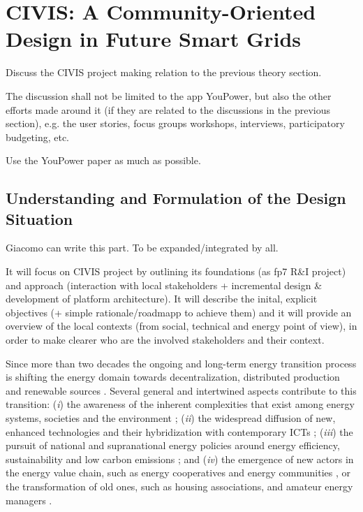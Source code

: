 \section{CIVIS: A Community-Oriented Design in Future Smart Grids}

\begin{svgraybox}
Discuss the CIVIS project making relation to the previous theory section. 

The discussion shall not be limited to the app YouPower, but also the other efforts made around it (if they are related to the discussions in the previous section), e.g. the user stories, focus groups workshops, interviews, participatory budgeting, etc. 

Use the YouPower paper as much as possible. 
\end{svgraybox}


\subsection{Understanding and Formulation of the Design Situation}
\begin{svgraybox}
[note by GP] Giacomo can write this part. To be expanded/integrated by all.

It will focus on CIVIS project by outlining its foundations (as fp7 R\&I project) and approach (interaction with local stakeholders + incremental design \& development of platform architecture). It will describe the inital, explicit objectives (+ simple rationale/roadmapp to achieve them) and it will provide an overview of the local contexts (from social, technical and energy point of view), in order to make clearer who are the involved stakeholders and their context.
\end{svgraybox}

Since more than two decades the ongoing and long-term energy transition process is shifting the energy domain
towards decentralization, distributed production and renewable sources \cite{rifkin_third_2011; sovacool_how_2016}.
Several general and intertwined aspects contribute to this transition: (\textit{i}) the awareness of the inherent complexities
that exist among energy systems, societies and the environment \cite{bulkeley_bringing_2012; umbach_global_2010}; (\textit{ii}) the
widespread diffusion of new, enhanced technologies and their hybridization with contemporary ICTs \cite{putrus_smart_2013; schick_innovating_2013};
(\textit{iii}) the pursuit of national and supranational energy policies around energy efficiency, sustainability and low carbon emissions \cite{da_graca_carvalho_eu_2012};
and (\textit{iv}) the emergence of new actors in the energy value chain, such as energy cooperatives and
energy communities \cite{viardot_role_2013}, or the transformation of old ones, such as housing associations,
and amateur energy managers \cite{hasselqvist_linking_2016}.

